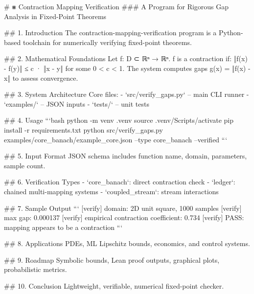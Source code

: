 
# ⨳ Contraction Mapping Verification
### A Program for Rigorous Gap Analysis in Fixed-Point Theorems

## 1. Introduction
The contraction-mapping-verification program is a Python-based toolchain for numerically verifying fixed-point theorems.

## 2. Mathematical Foundations
Let f: D ⊂ ℝⁿ → ℝⁿ. f is a contraction if:
‖f(x) - f(y)‖ ≤ c · ‖x - y‖ for some 0 < c < 1.
The system computes gaps g(x) = ‖f(x) - x‖ to assess convergence.

## 3. System Architecture
Core files:
- `src/verify_gaps.py` – main CLI runner
- `examples/` – JSON inputs
- `tests/` – unit tests

## 4. Usage
```bash
python -m venv .venv
source .venv/Scripts/activate
pip install -r requirements.txt
python src/verify_gaps.py examples/core_banach/example_core.json --type core_banach --verified
```

## 5. Input Format
JSON schema includes function name, domain, parameters, sample count.

## 6. Verification Types
- `core_banach`: direct contraction check
- `ledger`: chained multi-mapping systems
- `coupled_stream`: stream interactions

## 7. Sample Output
```
[verify] domain: 2D unit square, 1000 samples
[verify] max gap: 0.000137
[verify] empirical contraction coefficient: 0.734
[verify] PASS: mapping appears to be a contraction
```

## 8. Applications
PDEs, ML Lipschitz bounds, economics, and control systems.

## 9. Roadmap
Symbolic bounds, Lean proof outputs, graphical plots, probabilistic metrics.

## 10. Conclusion
Lightweight, verifiable, numerical fixed-point checker.
